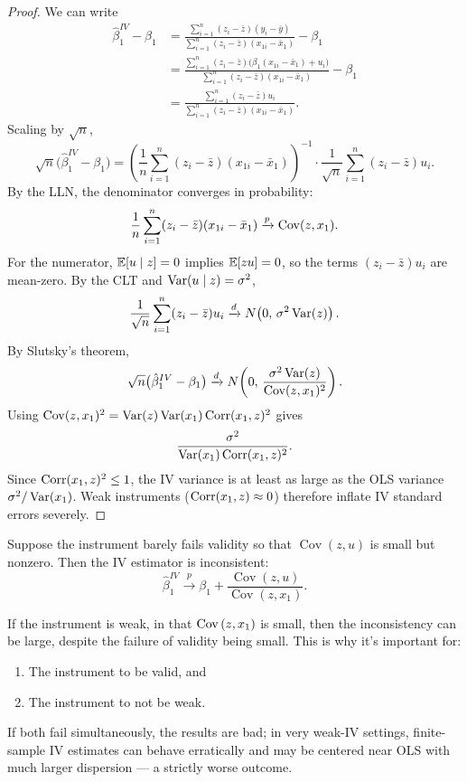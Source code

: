 \begin{proof}
	We can write
	\begin{align*}
		\hat{\beta}_1^{IV} - \beta_1
		&= \frac{\sum_{i=1}^{n}(z_i-\bar{z})(y_i-\bar{y})}{\sum_{i=1}^{n}(z_i-\bar{z})(x_{1i}-\bar{x}_1)} - \beta_1 \\
		&= \frac{\sum_{i=1}^{n}(z_i-\bar{z})\bigl(\beta_1(x_{1i}-\bar{x}_1)+u_i\bigr)}{\sum_{i=1}^{n}(z_i-\bar{z})(x_{1i}-\bar{x}_1)} - \beta_1 \\
		&= \frac{\sum_{i=1}^{n}(z_i-\bar{z})u_i}{\sum_{i=1}^{n}(z_i-\bar{z})(x_{1i}-\bar{x}_1)}
	.\end{align*}
	Scaling by $\sqrt{n}$,
	\[
		\sqrt{n}\bigl(\hat{\beta}_1^{IV}-\beta_1\bigr)
		= \left(\frac{1}{n}\sum_{i=1}^{n}(z_i-\bar{z})(x_{1i}-\bar{x}_1)\right)^{-1}
		\cdot \frac{1}{\sqrt{n}}\sum_{i=1}^{n}(z_i-\bar{z})u_i
	.\]
	By the LLN, the denominator converges in probability:
	\[
		\frac{1}{n}\sum_{i=1}^{n}(z_i-\bar{z})(x_{1i}-\bar{x}_1) \xrightarrow{p} \operatorname{Cov}(z,x_1)
	.\]
	For the numerator, $\mathbb{E}[u\mid z]=0$ implies $\mathbb{E}[zu]=0$, so the terms $(z_i-\bar{z})u_i$ are mean-zero. By the CLT and $\operatorname{Var}(u\mid z)=\sigma^2$,
	\[
		\frac{1}{\sqrt{n}}\sum_{i=1}^{n}(z_i-\bar{z})u_i \xrightarrow{d} N\!\left(0,\,\sigma^2\operatorname{Var}(z)\right)
	.\]
	By Slutsky's theorem,
	\[
		\sqrt{n}\bigl(\hat{\beta}_1^{IV}-\beta_1\bigr) \xrightarrow{d} N\!\left(0,\,\frac{\sigma^2\operatorname{Var}(z)}{\operatorname{Cov}(z,x_1)^2}\right)
	.\]
		Using $\operatorname{Cov}(z,x_1)^2 = \operatorname{Var}(z)\operatorname{Var}(x_1)\operatorname{Corr}(x_1,z)^2$ gives
		\[
			\frac{\sigma^2}{\operatorname{Var}(x_1)\operatorname{Corr}(x_1,z)^2}
		.\]
		Since $\operatorname{Corr}(x_1,z)^2\le 1$, the IV variance is at least as large as the OLS variance $\sigma^2/\operatorname{Var}(x_1)$.
		Weak instruments ($\operatorname{Corr}(x_1,z)\approx 0$) therefore inflate IV standard errors severely.
	\end{proof}

\begin{remark}
	Suppose the instrument barely fails validity so that $\operatorname{Cov}(z,u)$ is small but nonzero. Then the IV estimator is inconsistent: \[
		\hat{\beta}_1^{IV} \xrightarrow{p} \beta_1 + \frac{\operatorname{Cov}(z,u)}{\operatorname{Cov}(z,x_1)}
	.\]

	If the instrument is weak, in that $\operatorname{Cov}\left(z,x_1\right)$ is small, then the inconsistency can be large, despite the failure of validity being small. This is why it's important for:
	\begin{enumerate}[label = (\roman*)]
		\item The instrument to be valid, and
		\item The instrument to not be weak.
	\end{enumerate}
	If both fail simultaneously, the results are bad; in very weak-IV settings, finite-sample IV estimates can behave erratically and may be centered near OLS with much larger dispersion --- a strictly worse outcome.
\end{remark}

